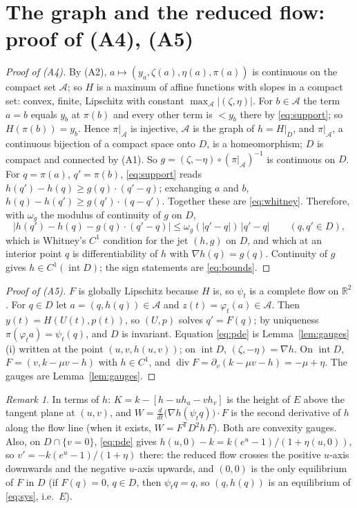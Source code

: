 \documentclass[11pt,a4paper]{article}
\numberwithin{equation}{section}
\theoremstyle{remark}\newtheorem{remark}[theorem]{Remark}
\newcommand{\R}{\mathbb R}
\newcommand{\cA}{\mathcal A}
\DeclareMathOperator{\inter}{int}
\DeclareMathOperator{\diver}{div}
\begin{document}
\section{The graph and the reduced flow: proof of (A4), (A5)}\label{sec:graph}
\begin{proof}[Proof of (A4)]
By (A2), $a\mapsto(y_a,\zeta(a),\eta(a),\pi(a))$ is continuous on the compact set $\cA$; so $H$ is a maximum of
affine functions with slopes in a compact set: convex, finite, Lipschitz with constant
$\max_\cA|(\zeta,\eta)|$. For $b\in\cA$ the term $a=b$ equals $y_b$ at $\pi(b)$ and every other term is $<y_b$ there
by \eqref{eq:support}; so $H(\pi(b))=y_b$. Hence $\pi|_\cA$ is injective, $\cA$ is the graph of $h=H|_D$, and
$\pi|_\cA$, a continuous bijection of a compact space onto $D$, is a homeomorphism; $D$ is compact and connected by
(A1). So $g=(\zeta,-\eta)\circ(\pi|_\cA)^{-1}$ is continuous on $D$. For $q=\pi(a)$, $q'=\pi(b)$, \eqref{eq:support}
reads $h(q')-h(q)\ge g(q)\cdot(q'-q)$; exchanging $a$ and $b$, $h(q)-h(q')\ge g(q')\cdot(q-q')$. Together these are
\eqref{eq:whitney}. Therefore, with $\omega_g$ the modulus of continuity of $g$ on $D$,
\[
\bigl|h(q')-h(q)-g(q)\cdot(q'-q)\bigr|\le\omega_g(|q'-q|)\,|q'-q|\qquad(q,q'\in D),
\]
which is Whitney's $C^1$ condition for the jet $(h,g)$ on $D$, and which at an interior point $q$ is
differentiability of $h$ with $\nabla h(q)=g(q)$. Continuity of $g$ gives $h\in C^1(\inter D)$; the sign statements
are \eqref{eq:bounds}.
\end{proof}
\begin{proof}[Proof of (A5)]
$F$ is globally Lipschitz because $H$ is, so $\psi_t$ is a complete flow on $\R^2$. For $q\in D$ let
$a=(q,h(q))\in\cA$ and $z(t)=\varphi_t(a)\in\cA$. Then $y(t)=H(U(t),p(t))$, so $(U,p)$ solves $q'=F(q)$; by
uniqueness $\pi(\varphi_ta)=\psi_t(q)$, and $D$ is invariant. Equation \eqref{eq:pde} is Lemma~\ref{lem:gauges}(i)
written at the point $(u,v,h(u,v))$; on $\inter D$, $(\zeta,-\eta)=\nabla h$. On $\inter D$, $F=(v,k-\mu v-h)$ with
$h\in C^1$, and $\diver F=\partial_v(k-\mu v-h)=-\mu+\eta$. The gauges are Lemma~\ref{lem:gauges}.
\end{proof}
\begin{remark}\label{rem:convexgauges}
In terms of $h$: $K=k-[h-uh_u-vh_v]$ is the height of $E$ above the tangent plane at $(u,v)$, and
$W=\frac{d}{dt}\bigl(\nabla h(\psi_tq)\bigr)\cdot F$ is the second derivative of $h$ along the flow line (when it
exists, $W=F^{\mathsf T}D^2h\,F$). Both are convexity gauges. Also, on $D\cap\{v=0\}$, \eqref{eq:pde} gives
$h(u,0)-k=k(e^{u}-1)/(1+\eta(u,0))$, so $v'=-k(e^{u}-1)/(1+\eta)$ there: the reduced flow crosses the positive
$u$-axis downwards and the negative $u$-axis upwards, and $(0,0)$ is the only equilibrium of $F$ in $D$ (if
$F(q)=0$, $q\in D$, then $\psi_tq=q$, so $(q,h(q))$ is an equilibrium of \eqref{eq:sys}, i.e.\ $E$).
\end{remark}
\end{document}
